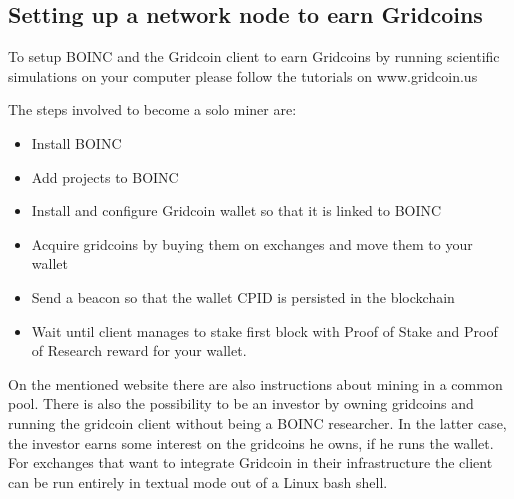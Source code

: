\subsection{Setting up a network node to earn Gridcoins}

To setup BOINC and the Gridcoin client to earn Gridcoins by running scientific simulations on your computer please follow the tutorials on www.gridcoin.us

The steps involved to become a solo miner are:
\begin{itemize}
  \item Install BOINC
  \item Add projects to BOINC
  \item Install and configure Gridcoin wallet so that it is linked to BOINC 
  \item Acquire gridcoins by buying them on exchanges and move them to your wallet
  \item Send a beacon so that the wallet CPID is persisted in the blockchain
  \item Wait until client manages to stake first block with Proof of Stake and Proof of Research reward for your wallet.
\end{itemize}

On the mentioned website there are also instructions about mining in a common pool. There is also the possibility to be an investor by owning gridcoins and running the gridcoin client without being a BOINC researcher. In the latter case, the investor earns some interest on the gridcoins he owns, if he runs the wallet.\\

For exchanges that want to integrate Gridcoin in their infrastructure the client can be run entirely in textual mode out of a Linux bash shell.\\

